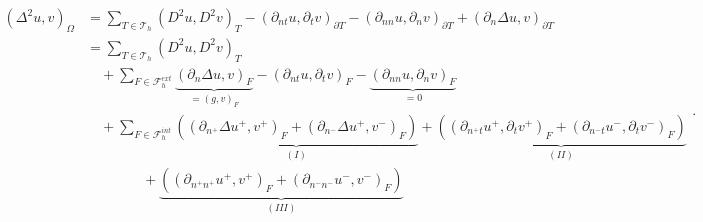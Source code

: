 \begin{equation*}
    \begin{split}
 \left( \Delta  ^{2} u,v \right) _{\Omega } & =\sum_{T\in \mathcal{T} _{h}}^{} \left( D^2u,D^2v \right) _{T } - \left(\partial _{nt} u, \partial _{t}v
\right)_{\partial T} - \left(\partial _{nn} u, \partial _{n}v \right)_{\partial T} + \left(\partial _{n} \Delta  u,v
\right)_{\partial T} \\
&= \sum_{T\in \mathcal{T} _{h}}^{} \left( D^2u,D^2v \right) _{T } \\
&  \quad + \sum_{F \in \mathcal{F}_{h}^{ext} }^{} \underbrace{\left( \partial _{n} \Delta  u, v  \right)_{F}}_{= \left( g,v \right)_{F} }  -  \left(
\partial _{nt} u, \partial _{t} v \right) _{F}  - \underbrace{\left( \partial _{nn} u, \partial _{n} v \right)_{F}}_{ = 0}    \\
& \quad  + \sum_{F \in \mathcal{F} _{h}^{int}}^{} \underbrace{\left( \left(\partial _{n^{+}} \Delta  u^{+}
        ,v^{+}\right)_{F}
+ \left(\partial _{n^{-}} \Delta  u^{+} ,v^{-}\right)_{F}  \right)}_{(I)} +
\underbrace{\left( \left(\partial _{n^{+}t} u^{+}, \partial_{t} v^{+} \right)_{F} +  \left(\partial _{n^{-}t} u^{-},
        \partial_{t} v^{-}
\right)_{F}  \right) }_{(II)} \\
 & \quad \quad \quad  \quad  +
\underbrace{\left( \left(\partial _{n^{+}n^{+}} u^{+}, v^{+} \right) _{F} + \left(\partial _{n^{-}n^{-}} u^{-}, v^{-}
\right) _{F} \right) }_{(III)}
    \end{split}
.\end{equation*}


